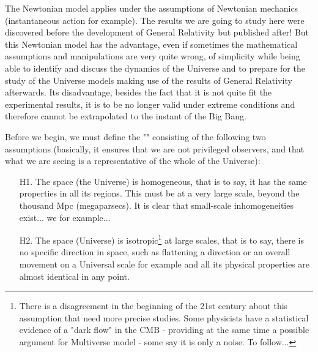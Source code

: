 	The Newtonian model applies under the assumptions of Newtonian mechanics (instantaneous action for example). The results we are going to study here were discovered before the development of General Relativity but published after! But this Newtonian model has the advantage, even if sometimes the mathematical assumptions and manipulations are very quite wrong, of simplicity while being able to identify and discuss the dynamics of the Universe and to prepare for the study of the Universe models making use of the results of General Relativity afterwards. Its disadvantage, besides the fact that it is not quite fit the experimental results, it is to be no longer valid under extreme conditions and therefore cannot be extrapolated to the instant of the Big Bang.
	
	Before we begin, we must define the "" consisting of the following two assumptions (basically, it ensures that we are not privileged observers, and that what we are seeing is a representative of the whole of the Universe):
	
	\begin{itemize}
		\item[H1.] The space (the Universe) is homogeneous, that is to say, it has the same properties in all its regions. This must be at a very large scale, beyond the thousand Mpc (megaparsecs). It is clear that small-scale inhomogeneities exist... we for example... \Winkey
		
		\item[H2.] The space (Universe) is isotropic\footnote{There is a disagreement in the beginning of the 21st century about this assumption that need more precise studies. Some physicists have a statistical evidence of a "dark flow" in the CMB - providing at the same time a possible argument for Multiverse model - some say it is only a noise. To follow...} at large scales, that is to say, there is no specific direction in space, such as flattening a direction or an overall movement on a Universal scale for example and all its physical properties are almost identical in any point.
	\end{itemize}
	

